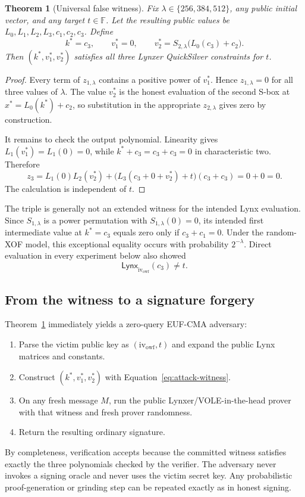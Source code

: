 \documentclass[11pt,a4paper]{article}
\newtheorem{theorem}{Theorem}
\newcommand{\F}{\mathbb{F}}
\newcommand{\Lynx}{\mathsf{Lynx}}
\begin{document}
\begin{theorem}[Universal false witness]
\label{thm:witness}
Fix $\lambda\in\{256,384,512\}$, any public initial vector, and any target $t\in\F$.
Let the resulting public values be $L_0,L_1,L_2,L_3,c_1,c_2,c_3$.  Define
\begin{equation}
  k^*=c_3,\qquad v_1^*=0,\qquad
  v_2^*=S_{2,\lambda}\bigl(L_0(c_3)+c_2\bigr).
  \label{eq:attack-witness}
\end{equation}
Then $(k^*,v_1^*,v_2^*)$ satisfies all three Lynxer QuickSilver constraints for $t$.
\end{theorem}

\begin{proof}
Every term of $z_{1,\lambda}$ contains a positive power of $v_1^*$.  Hence
$z_{1,\lambda}=0$ for all three values of $\lambda$.  The value $v_2^*$ is the honest
evaluation of the second S-box at $x^*=L_0(k^*)+c_2$, so substitution in the appropriate
$z_{2,\lambda}$ gives zero by construction.

It remains to check the output polynomial.  Linearity gives $L_1(v_1^*)=L_1(0)=0$, while
$k^*+c_3=c_3+c_3=0$ in characteristic two.  Therefore
\[
  z_3=L_1(0)L_2(v_2^*)+
      \bigl(L_3(c_3+0+v_2^*)+t\bigr)(c_3+c_3)=0+0=0.
\]
The calculation is independent of $t$.
\end{proof}

The triple is generally not an extended witness for the intended Lynx evaluation.  Since
$S_{1,\lambda}$ is a power permutation with $S_{1,\lambda}(0)=0$, its intended first
intermediate value at $k^*=c_3$ equals zero only if $c_3+c_1=0$.  Under the random-XOF
model, this exceptional equality occurs with probability $2^{-\lambda}$.  Direct evaluation
in every experiment below also showed
\[
  \Lynx_{\mathrm{iv}_{\mathrm{owf}}}(c_3)\neq t.
\]

\subsection{From the witness to a signature forgery}

Theorem~\ref{thm:witness} immediately yields a zero-query EUF-CMA adversary:
\begin{enumerate}[leftmargin=1.7em]
  \item Parse the victim public key as $(\mathrm{iv}_{\mathrm{owf}},t)$ and expand the public
        Lynx matrices and constants.
  \item Construct $(k^*,v_1^*,v_2^*)$ with Equation~\eqref{eq:attack-witness}.
  \item On any fresh message $M$, run the public Lynxer/VOLE-in-the-head prover with that
        witness and fresh prover randomness.
  \item Return the resulting ordinary signature.
\end{enumerate}
By completeness, verification accepts because the committed witness satisfies exactly the
three polynomials checked by the verifier.  The adversary never invokes a signing oracle and
never uses the victim secret key.  Any probabilistic proof-generation or grinding step can
be repeated exactly as in honest signing.
\end{document}
